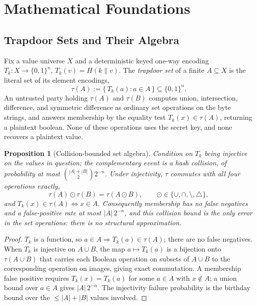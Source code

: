\documentclass[10pt,conference]{IEEEtran}
\newtheorem{proposition}[theorem]{Proposition}
\begin{document}
\section{Mathematical Foundations}
\label{sec:theory}

\subsection{Trapdoor Sets and Their Algebra}
\label{sec:trapdoor-set}

Fix a value universe $X$ and a deterministic keyed one-way encoding $T_k : X \to \{0,1\}^n$, $T_k(v) = H(k \| v)$. The \emph{trapdoor set} of a finite $A \subseteq X$ is the literal set of its element encodings,
$$\tau(A) := \{\, T_k(a) : a \in A \,\} \subseteq \{0,1\}^n.$$
An untrusted party holding $\tau(A)$ and $\tau(B)$ computes union, intersection, difference, and symmetric difference as ordinary set operations on the byte strings, and answers membership by the equality test $T_k(x) \in \tau(A)$, returning a plaintext boolean. None of these operations uses the secret key, and none recovers a plaintext value.

\begin{proposition}[Collision-bounded set algebra]
\label{prop:collision-bounded}
Condition on $T_k$ being injective on the values in question; the complementary event is a hash collision, of probability at most $\binom{|A|+|B|}{2} 2^{-n}$. Under injectivity, $\tau$ commutes with all four operations exactly,
$$\tau(A) \odot \tau(B) = \tau(A \odot B), \qquad \odot \in \{\cup, \cap, \setminus, \triangle\},$$
and $T_k(x) \in \tau(A) \iff x \in A$. Consequently membership has no false negatives and a false-positive rate at most $|A|\,2^{-n}$, and this collision bound is the \emph{only} error in the set operations: there is no structural approximation.
\end{proposition}

\begin{proof}
$T_k$ is a function, so $a \in A \Rightarrow T_k(a) \in \tau(A)$; there are no false negatives. When $T_k$ is injective on $A \cup B$, the map $a \mapsto T_k(a)$ is a bijection onto $\tau(A \cup B)$ that carries each Boolean operation on subsets of $A \cup B$ to the corresponding operation on images, giving exact commutation. A membership false positive requires $T_k(x) = T_k(a)$ for some $a \in A$ with $x \notin A$; a union bound over $a \in A$ gives $|A|\,2^{-n}$. The injectivity failure probability is the birthday bound over the $\le |A| + |B|$ values involved.
\end{proof}
\end{document}
